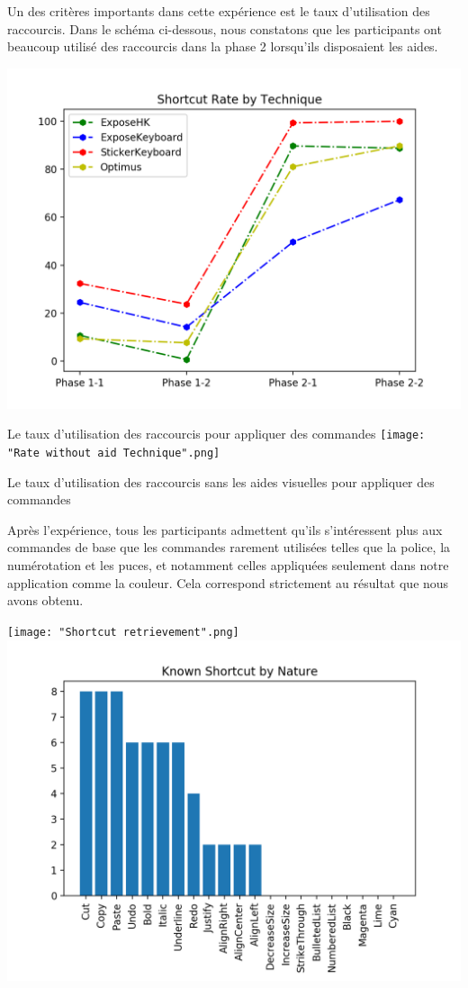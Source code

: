 \documentclass[12pt,a4paper]{article}
\begin{document}
Un des critères importants dans cette expérience est le taux d'utilisation des raccourcis. Dans le schéma ci-dessous, nous constatons que les participants ont beaucoup utilisé des raccourcis dans la phase 2 lorsqu'ils disposaient les aides.
\begin{center}
	\includegraphics[width=1\linewidth]{RateTechnique.png}
	
	Le taux d'utilisation des raccourcis pour appliquer des commandes
	\texttt{[image: "Rate without aid Technique".png]}
	
	Le taux d'utilisation des raccourcis sans les aides visuelles pour appliquer des commandes
\end{center}

Après l'expérience, tous les participants admettent qu'ils s'intéressent plus aux commandes de base que les commandes rarement utilisées telles que la police, la numérotation et les puces, et notamment celles appliquées seulement dans notre application comme la couleur. Cela correspond strictement au résultat que nous avons obtenu.
\begin{center}
	\texttt{[image: "Shortcut retrievement".png]}
	\includegraphics[width=0.9\linewidth]{Nature.png}
\end{center}
\end{document}
